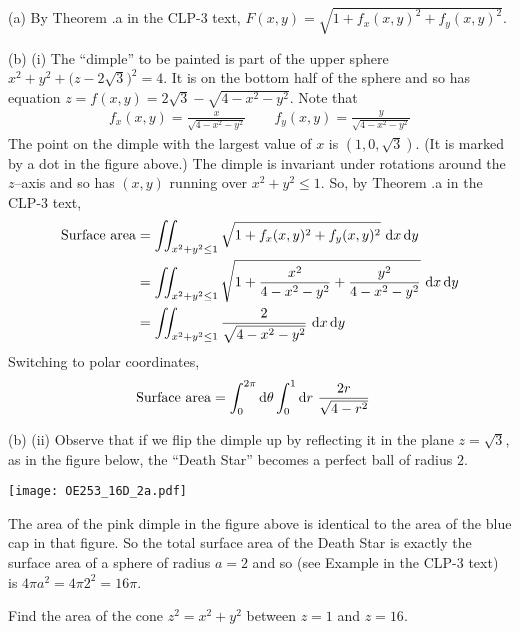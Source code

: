\begin{solution}
(a)
By Theorem .a in the CLP-3 text,
$F(x,y) = \sqrt{1+f_x(x,y)^2+f_y(x,y)^2}$.

(b)  (i) The ``dimple'' to be painted is part of the upper sphere
$x^2+y^2+\big(z-2\sqrt{3}\big)^2=4$. It is on the bottom half of the sphere
and so has equation $z=f(x,y)=2\sqrt{3}-\sqrt{4-x^2-y^2}$. Note that
\begin{align*}
f_x(x,y) = \frac{x}{\sqrt{4-x^2-y^2}}\qquad
f_y(x,y) = \frac{y}{\sqrt{4-x^2-y^2}}
\end{align*}
The point on the dimple with the largest value of $x$ is
$(1,0,\sqrt{3})$. (It is marked by a dot in the figure above.) The dimple
is invariant under rotations around the $z$--axis and so has $(x,y)$
running over $x^2+y^2\le 1$. So, by 
Theorem .a in the CLP-3 text,
\begin{align*}
\text{Surface area}
&= \dblInt_{x^2+y^2\le 1}\sqrt{1+f_x(x,y)^2+f_y(x,y)^2}\ \dee{x}\,\dee{y} \\
&= \dblInt_{x^2+y^2\le 1}\sqrt{1+\frac{x^2}{4-x^2-y^2}
                                +\frac{y^2}{4-x^2-y^2}}\ \dee{x}\,\dee{y} \\
&= \dblInt_{x^2+y^2\le 1}\frac{2}{\sqrt{4-x^2-y^2}}\ \dee{x}\,\dee{y} 
\end{align*}
Switching to polar coordinates,
\begin{align*}
\text{Surface area}
&= \int_0^{2\pi}\mathrm{d}\theta\int_0^1\mathrm{d}r\ \frac{2r}{\sqrt{4-r^2}}
\end{align*}

(b) (ii) Observe that if we flip the dimple up by reflecting it
in the plane $z=\sqrt{3}$, as in the figure below, the ``Death Star'' 
becomes a perfect ball of radius $2$.  
\begin{center}
     \texttt{[image: OE253\_16D\_2a.pdf]}
\end{center}
The area of the pink dimple in the figure above is identical to the area
of the blue cap in that figure. So the total surface area of the 
Death Star is exactly the surface area of a sphere of radius $a=2$ and so
(see Example  in the CLP-3 text)
is $4\pi a^2 = 4 \pi 2^2=16\pi$.

\end{solution}

\begin{question} [M200 2003A] %
Find the area of the cone $z^2=x^2+y^2$ between $z=1$ and $z=16$.
\end{question}

